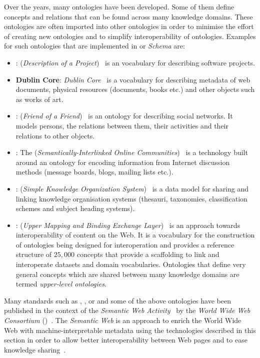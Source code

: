 Over the years, many ontologies have been developed. Some of them define concepts and relations that can be found across many knowledge domains. These ontologies are often imported into other ontologies in order to minimise the effort of creating new ontologies and to simplify interoperability of ontologies. Examples for such ontologies that are implemented in  or \emph{ Schema} are:
\begin{itemize}
  \item \textbf{}:  (\emph{Description of a Project})~\cite{DOAP} is an vocabulary for describing software projects.
  \item \textbf{Dublin Core}: \emph{Dublin Core}~\cite{DublinCoreWeb,rfc5013} is a vocabulary for describing metadata of web documents, physical resources (documents, books etc.) and other objects such as works of art.
  \item \textbf{}:  (\emph{Friend of a Friend})~\cite{FOAFWeb,FOAF} is an ontology for describing social networks. It models persons, the relations between them, their activities and their relations to other objects.
  \item \textbf{}: The  (\emph{Semantically-Interlinked Online Communities})~\cite{SIOC} is a technology built around an ontology for encoding information from Internet discussion methods (message boards, blogs, mailing lists etc.).
  \item \textbf{}:  (\emph{Simple Knowledge Organization System})~\cite{SKOSWeb,SKOS} is a data model for sharing and linking knowledge organisation systems (thesauri, taxonomies, classification schemes and subject heading systems).
  \item \textbf{}:  (\emph{Upper Mapping and Binding Exchange Layer})~\cite{UMBEL} is an approach towards interoperability of content on the Web. It is a vocabulary for the construction of ontologies being designed for interoperation and provides a reference structure of $25,000$ concepts that provide a scaffolding to link and interoperate datasets and domain vocabularies. Ontologies that define very general concepts which are shared between many knowledge domains are termed \emph{upper-level ontologies}.~\cite{upper_ontology}
\end{itemize}

Many standards such as , , or  and some of the above ontologies have been published in the context of the \emph{ Semantic Web Activity}~\cite{w3c_semantic_web} by the \emph{World Wide Web Consortium} ()~\cite{W3C}. The \emph{Semantic Web} is an approach to enrich the World Wide Web with machine-interpretable metadata using the technologies described in this section in order to allow better interoperability between Web pages and to ease knowledge sharing~\cite{semantic_web}.


